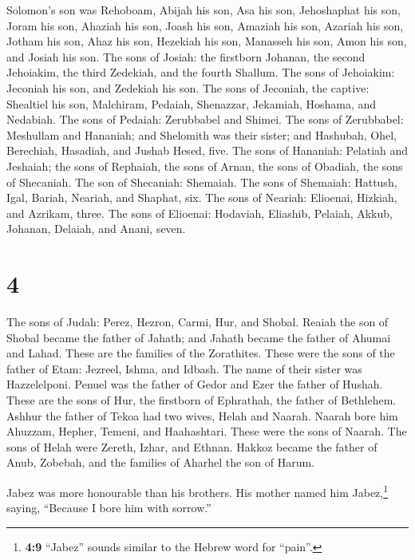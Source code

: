  Solomon's son was Rehoboam, Abijah his son, Asa his son,
Jehoshaphat his son,  Joram his son, Ahaziah his son,
Joash his son,  Amaziah his son, Azariah his son, Jotham
his son,  Ahaz his son, Hezekiah his son, Manasseh his
son,  Amon his son, and Josiah his son. 
The sons of Josiah: the firstborn Johanan, the second Jehoiakim, the
third Zedekiah, and the fourth Shallum.  The sons of
Jehoiakim: Jeconiah his son, and Zedekiah his son.  The
sons of Jeconiah, the captive: Shealtiel his son, 
Malchiram, Pedaiah, Shenazzar, Jekamiah, Hoshama, and Nedabiah.
 The sons of Pedaiah: Zerubbabel and Shimei. The sons of
Zerubbabel: Meshullam and Hananiah; and Shelomith was their sister;
 and Hashubah, Ohel, Berechiah, Hasadiah, and Jushab
Hesed, five.  The sons of Hananiah: Pelatiah and
Jeshaiah; the sons of Rephaiah, the sons of Arnan, the sons of Obadiah,
the sons of Shecaniah.  The son of Shecaniah: Shemaiah.
The sons of Shemaiah: Hattush, Igal, Bariah, Neariah, and Shaphat, six.
 The sons of Neariah: Elioenai, Hizkiah, and Azrikam,
three.  The sons of Elioenai: Hodaviah, Eliashib,
Pelaiah, Akkub, Johanan, Delaiah, and Anani, seven.

\hypertarget{section-3}{%
\section{4}\label{section-3}}

 The sons of Judah: Perez, Hezron, Carmi, Hur, and Shobal.
 Reaiah the son of Shobal became the father of Jahath; and
Jahath became the father of Ahumai and Lahad. These are the families of
the Zorathites.  These were the sons of the father of
Etam: Jezreel, Ishma, and Idbash. The name of their sister was
Hazzelelponi.  Penuel was the father of Gedor and Ezer the
father of Hushah. These are the sons of Hur, the firstborn of Ephrathah,
the father of Bethlehem.  Ashhur the father of Tekoa had
two wives, Helah and Naarah.  Naarah bore him Ahuzzam,
Hepher, Temeni, and Haahashtari. These were the sons of Naarah.
 The sons of Helah were Zereth, Izhar, and Ethnan.
 Hakkoz became the father of Anub, Zobebah, and the
families of Aharhel the son of Harum.

 Jabez was more honourable than his brothers. His mother
named him Jabez,\footnote{\textbf{4:9} ``Jabez'' sounds similar to the
  Hebrew word for ``pain''.} saying, ``Because I bore him with sorrow.''

